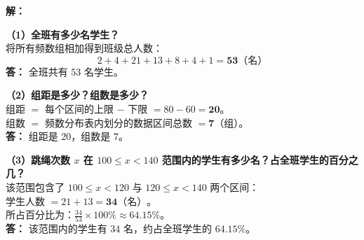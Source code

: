 \documentclass[12pt, a4paper]{ctexrep}
\begin{document}
\vspace{0.4cm}
\begin{center}
\renewcommand{\arraystretch}{1.6}
\end{center}

\vspace{0.4cm}

\textbf{解：}

\textbf{（1）全班有多少名学生？} \\
将所有频数组相加得到班级总人数：
$$2 + 4 + 21 + 13 + 8 + 4 + 1 = \boldsymbol{53}\text{（名）}$$
\textbf{答：} 全班共有 $53$ 名学生。

\vspace{0.4cm}

\textbf{（2）组距是多少？组数是多少？} \\
组距 $=$ 每个区间的上限 $-$ 下限 $= 80 - 60 = \boldsymbol{20}$。\\
组数 $=$ 频数分布表内划分的数据区间总数 $= \boldsymbol{7}$（组）。\\
\textbf{答：} 组距是 $20$，组数是 $7$。

\vspace{0.4cm}

\textbf{（3）跳绳次数 $x$ 在 $100 \leqslant x < 140$ 范围内的学生有多少名？占全班学生的百分之几？} \\
该范围包含了 $100 \leqslant x < 120$ 与 $120 \leqslant x < 140$ 两个区间：\\
学生人数 $= 21 + 13 = \boldsymbol{34}\text{（名）}$。\\
所占百分比为：$\frac{34}{53} \times 100\% \approx \boldsymbol{64.15\%}$。\\
\textbf{答：} 该范围内的学生有 $34$ 名，约占全班学生的 $64.15\%$。
\end{document}
